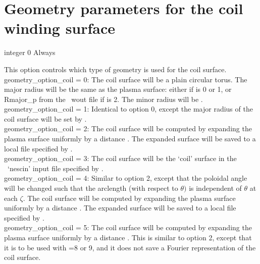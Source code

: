 \section{Geometry parameters for the coil winding surface}

{integer}
{0}
{Always}
{This option controls which type of geometry is used for the coil surface.\\

{\ttfamily geometry\_option\_coil} = 0: The coil surface will be a plain circular torus. The major radius will be the 
same as the plasma surface: either  if  is 0 or 1, or {\ttfamily Rmajor\_p} from the \vmec~{\ttfamily wout} file
if   is 2.
     The minor radius will be .\\

{\ttfamily geometry\_option\_coil} = 1: Identical to option 0, except the major radius of the coil surface will be set by .\\

{\ttfamily geometry\_option\_coil} = 2: The coil surface will be computed by expanding the plasma surface uniformly by a distance . The expanded surface will be saved to a local file specified by . \\

{\ttfamily geometry\_option\_coil} = 3: The coil surface will be the `coil' surface in the \nescoil~`nescin' input file specified by . \\

{\ttfamily geometry\_option\_coil} = 4: Similar to option 2, except that the poloidal angle will be changed such that the arclength (with respect to $\theta)$ is independent of $\theta$ at each $\zeta$. The coil surface will be computed by expanding the plasma surface uniformly by a distance . The expanded surface will be saved to a local file specified by . \\

{\ttfamily geometry\_option\_coil} = 5: The coil surface will be computed by expanding the plasma surface uniformly by a distance . This is similar to option 2, except that it is to be used with  =8 or 9, and it does not save a Fourier representation of the coil surface. 

}

